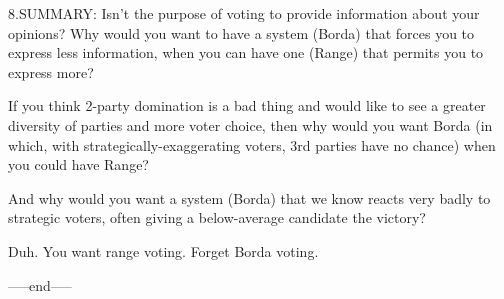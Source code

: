 8.SUMMARY:
Isn't the purpose of voting to provide information about your opinions?
Why would you want to have a system (Borda) that forces you to express less information,
when you can have one (Range) that permits you to express more?

If you think 2-party domination is a bad thing and would like to see a greater
diversity of parties and more voter choice,  then why would you want Borda (in which, with 
strategically-exaggerating voters, 3rd parties have no chance) when you could have Range?

And why would you want a system (Borda) that we know reacts very badly to strategic voters,
often giving a below-average candidate the victory?

Duh.  You want range voting.  Forget Borda voting.

-----end-----
